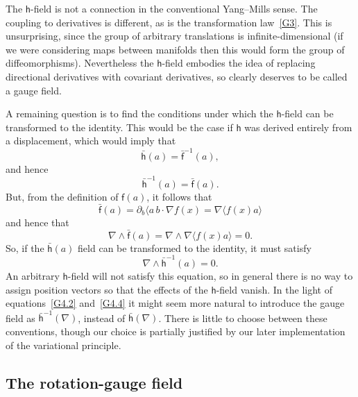 \documentclass[a4paper]{article}
\numberwithin{equation}{section}
\newcommand{\dt}{\! \cdot \!}
\newcommand{\wdg}{\! \wedge \!}
\newcommand{\la}{\langle}
\newcommand{\ra}{\rangle}
\newcommand{\db}{\partial_b}
\newcommand{\lif}{\mathsf{f}}
\newcommand{\lbf}{\bar{\mathsf{f}}}
\newcommand{\lih}{\mathsf{h}}
\newcommand{\lbh}{\bar{\mathsf{h}}}
\newcommand{\ho}{\lbh}
\newcommand{\fo}{\lbf}
\newcommand{\fu}{\lif}
\newcommand{\grad}{\nabla}
\begin{document}
The $\lih$-field is not a connection in the conventional Yang--Mills
sense.  The coupling to derivatives is different, as is the
transformation law~\eqref{G3}.  This is unsurprising, since the group of
arbitrary translations is infinite-dimensional (if we were considering
maps between manifolds then this would form the group of
diffeomorphisms).  Nevertheless the $\lih$-field embodies the idea of
replacing directional derivatives with covariant derivatives, so
clearly deserves to be called a gauge field.


A remaining question is to find the conditions under which the
$\lih$-field can be transformed to the identity.  This would be the
case if $\lih$ was derived entirely from a displacement, which would
imply that
%
\begin{equation}
\ho(a) = \fo^{-1}(a),
\end{equation}
%
and hence
%
\begin{equation}
\ho^{-1}(a) = \fo(a).
\label{G4}
\end{equation}
%
But, from the definition of $\fu(a)$, it follows that
%
\begin{equation}
\fo(a) = \db \la a \, b \dt \grad f(x) = \grad \la f(x) a \ra
\end{equation} 
%
and hence that
%
\begin{equation}
\grad \wdg \fo(a) = \grad \wdg \grad \la f(x) a \ra = 0.
\label{G4.2}
\end{equation}
%
So, if the $\ho(a)$ field can be transformed to the identity, it
must satisfy
%
\begin{equation}
\grad \wdg \ho^{-1}(a) =0.
\label{G4.4}
\end{equation}
%
An arbitrary $\lih$-field will not satisfy this equation, so in general
there is no way to assign position vectors so that the effects of the
$\lih$-field vanish.  In the light of equations~\eqref{G4.2} and~\eqref{G4.4}
it might seem more natural to introduce the gauge field as
$\ho^{-1}(\grad)$, instead of $\ho(\grad)$.  There is little to choose
between these conventions, though our choice is partially justified by
our later implementation of the variational principle.


\subsection{The rotation-gauge field}
\label{FRGF}
\end{document}
